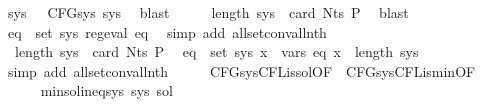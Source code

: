 \begin{isabellebody}
\ sys\ \ {\isacharasterisk}{\kern0pt}{\isacharcolon}{\kern0pt}\ {\isachardoublequoteopen}CFG{\isacharunderscore}{\kern0pt}sys\ sys{\isachardoublequoteclose}\ \isamarkupfalse%
\ blast\isanewline
\ \ \isamarkupfalse%
\ \isamarkupfalse%
\ {\isachardoublequoteopen}length\ sys\ {\isacharequal}{\kern0pt}\ card\ {\isacharparenleft}{\kern0pt}Nts\ P{\isacharparenright}{\kern0pt}{\isachardoublequoteclose}\ \isamarkupfalse%
\ blast\isanewline
\ \ \isamarkupfalse%
\ \isamarkupfalse%
\ {\isacharasterisk}{\kern0pt}\ \isamarkupfalse%
\ {\isachardoublequoteopen}{\isasymforall}eq\ {\isasymin}\ set\ sys{\isachardot}{\kern0pt}\ reg{\isacharunderscore}{\kern0pt}eval\ eq{\isachardoublequoteclose}\ \isamarkupfalse%
\ {\isacharparenleft}{\kern0pt}simp\ add{\isacharcolon}{\kern0pt}\ all{\isacharunderscore}{\kern0pt}set{\isacharunderscore}{\kern0pt}conv{\isacharunderscore}{\kern0pt}all{\isacharunderscore}{\kern0pt}nth{\isacharparenright}{\kern0pt}\isanewline
\ \ \isamarkupfalse%
\ \isamarkupfalse%
\ {\isacharasterisk}{\kern0pt}\ {\isacartoucheopen}length\ sys\ {\isacharequal}{\kern0pt}\ card\ {\isacharparenleft}{\kern0pt}Nts\ P{\isacharparenright}{\kern0pt}{\isacartoucheclose}\ \isamarkupfalse%
\ {\isachardoublequoteopen}{\isasymforall}eq\ {\isasymin}\ set\ sys{\isachardot}{\kern0pt}\ {\isasymforall}x\ {\isasymin}\ vars\ eq{\isachardot}{\kern0pt}\ x\ {\isacharless}{\kern0pt}\ length\ sys{\isachardoublequoteclose}\isanewline
\ \ \ \ \isamarkupfalse%
\ {\isacharparenleft}{\kern0pt}simp\ add{\isacharcolon}{\kern0pt}\ all{\isacharunderscore}{\kern0pt}set{\isacharunderscore}{\kern0pt}conv{\isacharunderscore}{\kern0pt}all{\isacharunderscore}{\kern0pt}nth{\isacharparenright}{\kern0pt}\isanewline
\ \ \isamarkupfalse%
\ \isamarkupfalse%
\ CFG{\isacharunderscore}{\kern0pt}sys{\isacharunderscore}{\kern0pt}CFL{\isacharunderscore}{\kern0pt}is{\isacharunderscore}{\kern0pt}sol{\isacharbrackleft}{\kern0pt}OF\ {\isacharasterisk}{\kern0pt}{\isacharbrackright}{\kern0pt}\ CFG{\isacharunderscore}{\kern0pt}sys{\isacharunderscore}{\kern0pt}CFL{\isacharunderscore}{\kern0pt}is{\isacharunderscore}{\kern0pt}min{\isacharbrackleft}{\kern0pt}OF\ {\isacharasterisk}{\kern0pt}{\isacharbrackright}{\kern0pt}\isanewline
\ \ \ \ \isamarkupfalse%
\ {\isachardoublequoteopen}min{\isacharunderscore}{\kern0pt}sol{\isacharunderscore}{\kern0pt}ineq{\isacharunderscore}{\kern0pt}sys\ sys\ sol{\isachardoublequoteclose}\ \isamarkupfalse%

\end{isabellebody}
